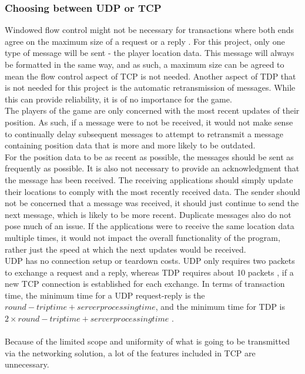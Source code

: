 \subsubsection{Choosing between UDP or TCP}
Windowed flow control might not be necessary for transactions where both ends agree on the maximum size of a request or a reply \cite{socketnetworking}.
For this project, only one type of message will be sent - the player location data.
This message will always be formatted in the same way, and as such, a maximum size can be agreed to mean the flow control aspect of TCP is not needed.
Another aspect of TDP that is not needed for this project is the automatic retransmission of messages.
While this can provide reliability, it is of no importance for the game.\\
The players of the game are only concerned with the most recent updates of their position.
As such, if a message were to not be received, it would not make sense to continually delay subsequent messages to attempt to retransmit a message containing position data that is more and more likely to be outdated.\\
For the position data to be as recent as possible, the messages should be sent as frequently as possible.
It is also not necessary to provide an acknowledgment that the message has been received.
The receiving applications should simply update their locations to comply with the most recently received data.
The sender should not be concerned that a message was received, it should just continue to send the next message, which is likely to be more recent.
Duplicate messages also do not pose much of an issue.
If the applications were to receive the same location data multiple times, it would not impact the overall functionality of the program, rather just the speed at which the next updates would be received.\\
UDP has no connection setup or teardown costs.
UDP only requires two packets to exchange a request and a reply, whereas TDP requires about 10 packets \cite{socketnetworking}, if a new TCP connection is established for each exchange.
In terms of transaction time, the minimum time for a UDP request-reply is the $round-trip time + server processing time$, and the minimum time for TDP is $2 \times round-trip time + server processing time$ \cite{socketnetworking}.
\\\\
Because of the limited scope and uniformity of what is going to be transmitted via the networking solution, a lot of the features included in TCP are unnecessary.
